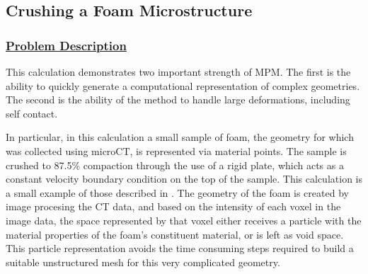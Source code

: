 \newpage
\subsection*{\center Crushing a Foam Microstructure}
\subsubsection*{\underline{Problem Description}}
This calculation demonstrates two important strength of MPM.  The first
is the ability to quickly generate a computational representation of
complex geometries.  The second is the ability of the method to handle
large deformations, including self contact.

In particular, in this calculation a small sample of foam, the geometry
for which was collected using microCT, is represented via material points.
The sample is crushed to 87.5\% compaction through the use of a rigid plate, which
acts as a constant velocity boundary condition on the top of the sample.  This
calculation is a small example of those described in \cite{brydonfoam}.  The
geometry of the foam is created by image procesing the CT data, and based
on the intensity of each voxel in the image data, the space represented
by that voxel either receives a particle with the material properties of the
foam's constituent material, or is left as void space.  This particle
representation avoids the time consuming steps required to build a suitable
unstructured mesh for this very complicated geometry.
 

